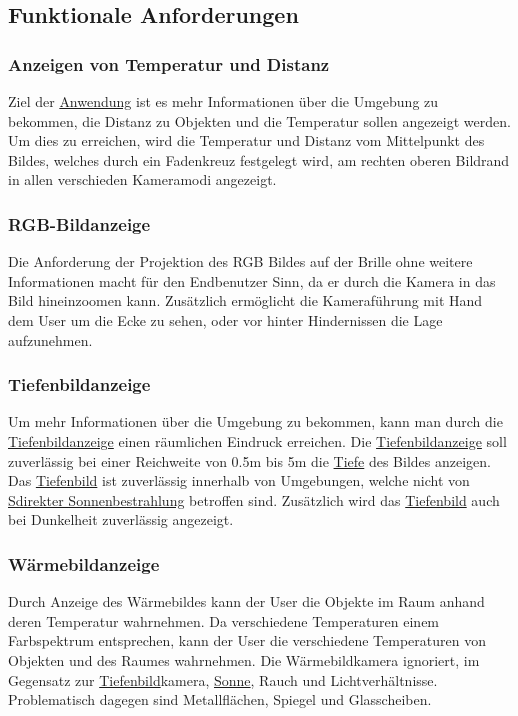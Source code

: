 \subsection{Funktionale Anforderungen}

\subsubsection{Anzeigen von Temperatur und Distanz}
Ziel der \hyperlink{tab:anwendung}{Anwendung} ist es mehr Informationen über die Umgebung zu bekommen, \va die Distanz zu Objekten und die Temperatur sollen angezeigt werden.
Um dies zu erreichen, wird die Temperatur und Distanz vom Mittelpunkt des Bildes, welches durch ein Fadenkreuz festgelegt wird, am rechten oberen Bildrand in allen verschieden Kameramodi angezeigt.

\subsubsection{RGB-Bildanzeige}
Die Anforderung der Projektion des RGB Bildes auf der Brille ohne weitere Informationen macht für den Endbenutzer Sinn, da er durch die Kamera in das Bild hineinzoomen kann.
Zusätzlich ermöglicht die Kameraführung mit Hand dem User um die Ecke zu sehen, oder vor \bzw hinter Hindernissen die Lage aufzunehmen.

\subsubsection{Tiefenbildanzeige}
Um mehr Informationen über die Umgebung zu bekommen, kann man durch die \hyperlink{tab:tiefe}{Tiefenbildanzeige} einen räumlichen Eindruck erreichen.
Die \hyperlink{tab:tiefe}{Tiefenbildanzeige} soll zuverlässig bei einer Reichweite von 0.5m bis 5m die \hyperlink{tab:tiefe}{Tiefe} des Bildes anzeigen.
Das \hyperlink{tab:tiefe}{Tiefenbild} ist zuverlässig innerhalb von Umgebungen, welche nicht von  \hyperlink{tab:sonne}{Sdirekter Sonnenbestrahlung} betroffen sind.
Zusätzlich wird das \hyperlink{tab:tiefe}{Tiefenbild} auch bei Dunkelheit zuverlässig angezeigt.

\subsubsection{Wärmebildanzeige}
Durch Anzeige des Wärmebildes kann der User die Objekte im Raum anhand deren Temperatur wahrnehmen.
Da verschiedene Temperaturen einem Farbspektrum entsprechen, kann der User die verschiedene Temperaturen von Objekten und des Raumes wahrnehmen.
Die Wärmebildkamera ignoriert, im Gegensatz zur \hyperlink{tab:tiefe}{Tiefenbild}kamera, \hyperlink{tab:sonne}{Sonne}, Rauch und Lichtverhältnisse.
Problematisch dagegen sind Metallflächen, Spiegel und Glasscheiben.

